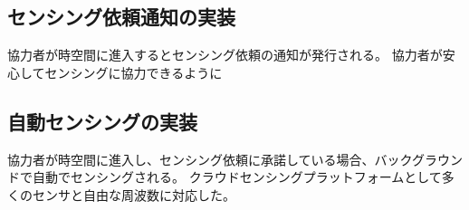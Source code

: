 


\subsection{センシング依頼通知の実装}
\label{myApp_notify}
協力者が時空間に進入するとセンシング依頼の通知が発行される。
協力者が安心してセンシングに協力できるように

\subsection{自動センシングの実装}
\label{myApp_sensing}
協力者が時空間に進入し、センシング依頼に承諾している場合、バックグラウンドで自動でセンシングされる。
クラウドセンシングプラットフォームとして多くのセンサと自由な周波数に対応した。


